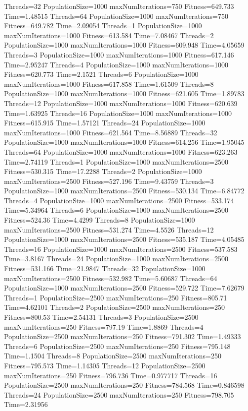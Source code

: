 \documentclass[10pt,letterpaper]{article}
\begin{document}
Threads=32 PopulationSize=1000 maxNumIterations=750 Fitness=649.733 Time=1.48515
Threads=64 PopulationSize=1000 maxNumIterations=750 Fitness=649.782 Time=2.09054
Threads=1 PopulationSize=1000 maxNumIterations=1000 Fitness=613.584 Time=7.08467
Threads=2 PopulationSize=1000 maxNumIterations=1000 Fitness=609.948 Time=4.05659
Threads=3 PopulationSize=1000 maxNumIterations=1000 Fitness=617.146 Time=2.95247
Threads=4 PopulationSize=1000 maxNumIterations=1000 Fitness=620.773 Time=2.1521
Threads=6 PopulationSize=1000 maxNumIterations=1000 Fitness=617.858 Time=1.61509
Threads=8 PopulationSize=1000 maxNumIterations=1000 Fitness=621.605 Time=1.89783
Threads=12 PopulationSize=1000 maxNumIterations=1000 Fitness=620.639 Time=1.63925
Threads=16 PopulationSize=1000 maxNumIterations=1000 Fitness=615.915 Time=1.57121
Threads=24 PopulationSize=1000 maxNumIterations=1000 Fitness=621.564 Time=8.56889
Threads=32 PopulationSize=1000 maxNumIterations=1000 Fitness=614.256 Time=1.95045
Threads=64 PopulationSize=1000 maxNumIterations=1000 Fitness=623.263 Time=2.74119
Threads=1 PopulationSize=1000 maxNumIterations=2500 Fitness=530.315 Time=17.2288
Threads=2 PopulationSize=1000 maxNumIterations=2500 Fitness=527.196 Time=9.43759
Threads=3 PopulationSize=1000 maxNumIterations=2500 Fitness=530.134 Time=6.84772
Threads=4 PopulationSize=1000 maxNumIterations=2500 Fitness=533.174 Time=5.34964
Threads=6 PopulationSize=1000 maxNumIterations=2500 Fitness=524.36 Time=4.4299
Threads=8 PopulationSize=1000 maxNumIterations=2500 Fitness=531.274 Time=4.5526
Threads=12 PopulationSize=1000 maxNumIterations=2500 Fitness=535.187 Time=4.05485
Threads=16 PopulationSize=1000 maxNumIterations=2500 Fitness=537.583 Time=3.8167
Threads=24 PopulationSize=1000 maxNumIterations=2500 Fitness=531.166 Time=21.9847
Threads=32 PopulationSize=1000 maxNumIterations=2500 Fitness=532.982 Time=5.60687
Threads=64 PopulationSize=1000 maxNumIterations=2500 Fitness=529.722 Time=7.62679
Threads=1 PopulationSize=2500 maxNumIterations=250 Fitness=805.71 Time=4.62101
Threads=2 PopulationSize=2500 maxNumIterations=250 Fitness=800.53 Time=2.54131
Threads=3 PopulationSize=2500 maxNumIterations=250 Fitness=797.19 Time=1.8869
Threads=4 PopulationSize=2500 maxNumIterations=250 Fitness=791.302 Time=1.49333
Threads=6 PopulationSize=2500 maxNumIterations=250 Fitness=795.148 Time=1.1504
Threads=8 PopulationSize=2500 maxNumIterations=250 Fitness=795.573 Time=1.14305
Threads=12 PopulationSize=2500 maxNumIterations=250 Fitness=796.736 Time=0.977717
Threads=16 PopulationSize=2500 maxNumIterations=250 Fitness=784.568 Time=0.846598
Threads=24 PopulationSize=2500 maxNumIterations=250 Fitness=798.705 Time=2.31956
\end{document}
